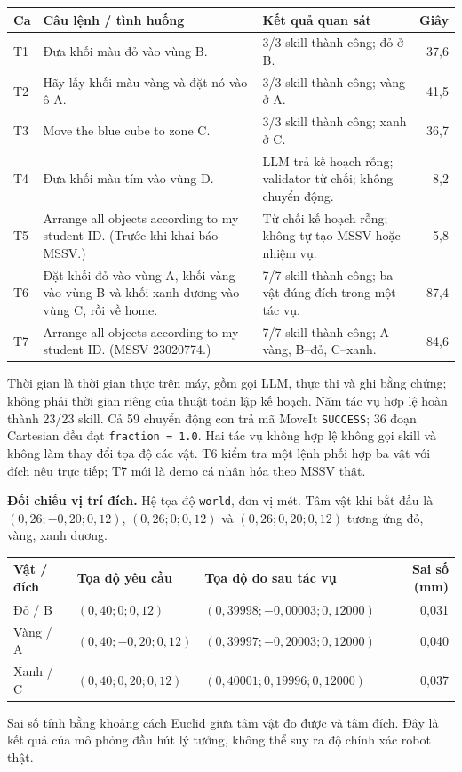 \documentclass[11pt,a4paper]{article}
\begin{document}
\begingroup\small
\begin{tabularx}{\linewidth}{@{}p{0.6cm}Yp{3.55cm}r@{}}
\toprule\textbf{Ca} & \textbf{Câu lệnh / tình huống} & \textbf{Kết quả quan sát} & \textbf{Giây}\\\midrule
T1 & Đưa khối màu đỏ vào vùng B. & 3/3 skill thành công; đỏ ở B. & 37,6\\
T2 & Hãy lấy khối màu vàng và đặt nó vào ô A. & 3/3 skill thành công; vàng ở A. & 41,5\\
T3 & Move the blue cube to zone C. & 3/3 skill thành công; xanh ở C. & 36,7\\
T4 & Đưa khối màu tím vào vùng D. & LLM trả kế hoạch rỗng; validator từ chối; không chuyển động. & 8,2\\
T5 & Arrange all objects according to my student ID. (Trước khi khai báo MSSV.) & Từ chối kế hoạch rỗng; không tự tạo MSSV hoặc nhiệm vụ. & 5,8\\
T6 & Đặt khối đỏ vào vùng A, khối vàng vào vùng B và khối xanh dương vào vùng C, rồi về home. & 7/7 skill thành công; ba vật đúng đích trong một tác vụ. & 87,4\\
T7 & Arrange all objects according to my student ID. (MSSV 23020774.) & 7/7 skill thành công; A--vàng, B--đỏ, C--xanh. & 84,6\\
\bottomrule
\end{tabularx}
\endgroup

Thời gian là thời gian thực trên máy, gồm gọi LLM, thực thi và ghi bằng chứng;
không phải thời gian riêng của thuật toán lập kế hoạch. Năm tác vụ hợp lệ hoàn
thành 23/23 skill. Cả 59 chuyển động con trả mã MoveIt \texttt{SUCCESS}; 36 đoạn
Cartesian đều đạt \texttt{fraction = 1.0}. Hai tác vụ không hợp lệ không gọi
skill và không làm thay đổi tọa độ các vật. T6 kiểm tra một lệnh phối hợp ba
vật với đích nêu trực tiếp; T7 mới là demo cá nhân hóa theo MSSV thật.

\textbf{Đối chiếu vị trí đích.} Hệ tọa độ \texttt{world}, đơn vị mét. Tâm vật
khi bắt đầu là $(0{,}26;-0{,}20;0{,}12)$, $(0{,}26;0;0{,}12)$ và
$(0{,}26;0{,}20;0{,}12)$ tương ứng đỏ, vàng, xanh dương.
\begin{center}\small
\begin{tabular}{@{}lllr@{}}
\toprule\textbf{Vật / đích} & \textbf{Tọa độ yêu cầu} & \textbf{Tọa độ đo sau tác vụ} & \textbf{Sai số (mm)}\\\midrule
Đỏ / B & $(0{,}40;0;0{,}12)$ & $(0{,}39998;-0{,}00003;0{,}12000)$ & 0,031\\
Vàng / A & $(0{,}40;-0{,}20;0{,}12)$ & $(0{,}39997;-0{,}20003;0{,}12000)$ & 0,040\\
Xanh / C & $(0{,}40;0{,}20;0{,}12)$ & $(0{,}40001;0{,}19996;0{,}12000)$ & 0,037\\
\bottomrule
\end{tabular}
\end{center}
Sai số tính bằng khoảng cách Euclid giữa tâm vật đo được và tâm đích. Đây là
kết quả của mô phỏng đầu hút lý tưởng, không thể suy ra độ chính xác robot thật.
\end{document}
